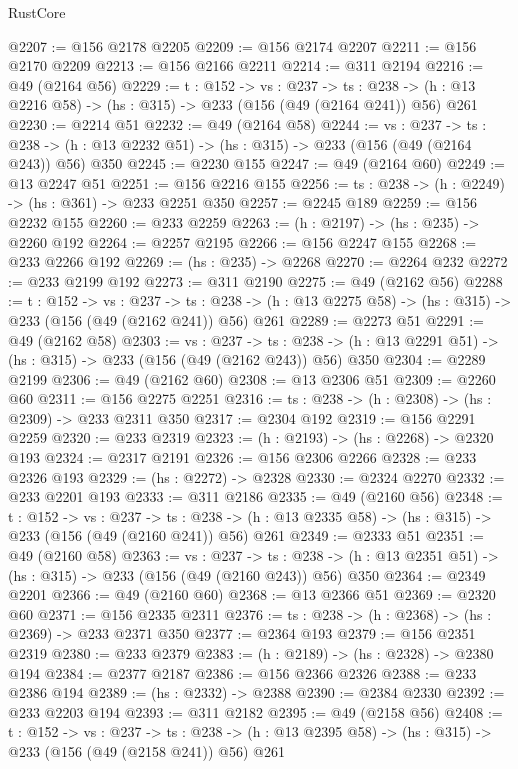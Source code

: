 \begin{lexlean}{RustCore}
\begin{coremodule}
@2207 := @156 @2178 @2205
@2209 := @156 @2174 @2207
@2211 := @156 @2170 @2209
@2213 := @156 @2166 @2211
@2214 := @311 @2194
@2216 := @49 (@2164 @56)
@2229 := {t : @152} ->
  {vs : @237} ->
  {ts : @238} -> (h : @13 @2216 @58) -> (hs : @315) -> @233 (@156 (@49 (@2164 @241)) @56) @261
@2230 := @2214 @51
@2232 := @49 (@2164 @58)
@2244 := {vs : @237} ->
  {ts : @238} -> (h : @13 @2232 @51) -> (hs : @315) -> @233 (@156 (@49 (@2164 @243)) @56) @350
@2245 := @2230 @155
@2247 := @49 (@2164 @60)
@2249 := @13 @2247 @51
@2251 := @156 @2216 @155
@2256 := {ts : @238} -> (h : @2249) -> (hs : @361) -> @233 @2251 @350
@2257 := @2245 @189
@2259 := @156 @2232 @155
@2260 := @233 @2259
@2263 := (h : @2197) -> (hs : @235) -> @2260 @192
@2264 := @2257 @2195
@2266 := @156 @2247 @155
@2268 := @233 @2266 @192
@2269 := (hs : @235) -> @2268
@2270 := @2264 @232
@2272 := @233 @2199 @192
@2273 := @311 @2190
@2275 := @49 (@2162 @56)
@2288 := {t : @152} ->
  {vs : @237} ->
  {ts : @238} -> (h : @13 @2275 @58) -> (hs : @315) -> @233 (@156 (@49 (@2162 @241)) @56) @261
@2289 := @2273 @51
@2291 := @49 (@2162 @58)
@2303 := {vs : @237} ->
  {ts : @238} -> (h : @13 @2291 @51) -> (hs : @315) -> @233 (@156 (@49 (@2162 @243)) @56) @350
@2304 := @2289 @2199
@2306 := @49 (@2162 @60)
@2308 := @13 @2306 @51
@2309 := @2260 @60
@2311 := @156 @2275 @2251
@2316 := {ts : @238} -> (h : @2308) -> (hs : @2309) -> @233 @2311 @350
@2317 := @2304 @192
@2319 := @156 @2291 @2259
@2320 := @233 @2319
@2323 := (h : @2193) -> (hs : @2268) -> @2320 @193
@2324 := @2317 @2191
@2326 := @156 @2306 @2266
@2328 := @233 @2326 @193
@2329 := (hs : @2272) -> @2328
@2330 := @2324 @2270
@2332 := @233 @2201 @193
@2333 := @311 @2186
@2335 := @49 (@2160 @56)
@2348 := {t : @152} ->
  {vs : @237} ->
  {ts : @238} -> (h : @13 @2335 @58) -> (hs : @315) -> @233 (@156 (@49 (@2160 @241)) @56) @261
@2349 := @2333 @51
@2351 := @49 (@2160 @58)
@2363 := {vs : @237} ->
  {ts : @238} -> (h : @13 @2351 @51) -> (hs : @315) -> @233 (@156 (@49 (@2160 @243)) @56) @350
@2364 := @2349 @2201
@2366 := @49 (@2160 @60)
@2368 := @13 @2366 @51
@2369 := @2320 @60
@2371 := @156 @2335 @2311
@2376 := {ts : @238} -> (h : @2368) -> (hs : @2369) -> @233 @2371 @350
@2377 := @2364 @193
@2379 := @156 @2351 @2319
@2380 := @233 @2379
@2383 := (h : @2189) -> (hs : @2328) -> @2380 @194
@2384 := @2377 @2187
@2386 := @156 @2366 @2326
@2388 := @233 @2386 @194
@2389 := (hs : @2332) -> @2388
@2390 := @2384 @2330
@2392 := @233 @2203 @194
@2393 := @311 @2182
@2395 := @49 (@2158 @56)
@2408 := {t : @152} ->
  {vs : @237} ->
  {ts : @238} -> (h : @13 @2395 @58) -> (hs : @315) -> @233 (@156 (@49 (@2158 @241)) @56) @261

\end{coremodule}
\end{lexlean}
